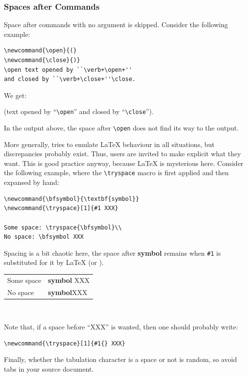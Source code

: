 \subsubsection{Spaces after Commands}
Space after commands with no argument is skipped.
Consider the following example:
\begin{verbatim}
\newcommand{\open}{(}
\newcommand{\close}{)}
\open text opened by ``\verb+\open+''
and closed by ``\verb+\close+''\close.
\end{verbatim}
We get:
\begin{htmlout}
\newcommand{\open}{(}
\newcommand{\close}{)}
\open text opened by ``\verb+\open+'' and closed by
``\verb+\close+''\close.
\end{htmlout}
In the output above, the space after \verb+\open+ does not
find its way to the output.


More generally,
\hevea{} tries to emulate \LaTeX{} behaviour in all situations, but
discrepancies probably exist.
Thus, users are invited to make explicit what they want.
This is good practice anyway, because \LaTeX{} is mysterious
here. Consider the following example, where the \verb+\tryspace+
macro is first applied and then expansed by hand:
\begin{verbatim}
\newcommand{\bfsymbol}{\textbf{symbol}}
\newcommand{\tryspace}[1]{#1 XXX}

Some space: \tryspace{\bfsymbol}\\
No space: \bfsymbol XXX
\end{verbatim}
Spacing is a bit chaotic here,
the space after \textbf{symbol} remains when \verb+#1+ is substituted for it
by \LaTeX{} (or \hevea).

\begin{htmlout}
\newcommand{\bfsymbol}{\textbf{symbol}}
\newcommand{\tryspace}[1]{#1 XXX}
\begin{tabular}{l@{~:~}l}
Some space & \tryspace{\bfsymbol}\\
No space   & \bfsymbol XXX
\end{tabular}%
\par ~\vspace{-1ex}
\end{htmlout}
Note that, if a space before ``XXX'' is wanted, then
one should probably write:
\begin{verbatim}
\newcommand{\tryspace}[1]{#1{} XXX}
\end{verbatim}

Finally, whether the tabulation character is a space or not 
is random, so avoid tabs in your source document.

